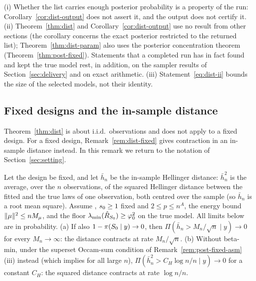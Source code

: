 
\begin{remark}\label{rem:dist-output}
(i) Whether the list carries enough posterior probability is a property of the run: Corollary~\ref{cor:dist-output} does
not assert it, and the output does not certify it.
(ii) Theorem~\ref{thm:dist} and Corollary~\ref{cor:dist-output} use no result from other sections (the corollary concerns
the exact posterior restricted to the returned list);
Theorem~\ref{thm:dist-param} also uses the posterior concentration theorem (Theorem~\ref{thm:post-fixed}). Statements that
a completed run has in fact found and kept the true model rest, in addition, on the sampler results of
Section~\ref{sec:delivery} and on exact arithmetic.
(iii) Statement~\eqref{eq:dist-ii} bounds the size of the selected models, not their identity.
\end{remark}

\subsection{Fixed designs and the in-sample distance}\label{sec:dist-fixed}

Theorem~\ref{thm:dist} is about i.i.d.\ observations and does not apply to a fixed design. For a fixed design,
Remark~\ref{rem:dist-fixed} gives contraction in an in-sample distance instead. In this remark we return to the notation
of Section~\ref{sec:setting}.

\begin{remark}\label{rem:dist-fixed}
Let the design be fixed, and let $\bar h_n$ be the in-sample Hellinger distance: $\bar h_n^2$ is the average, over the $n$
observations, of the squared Hellinger distance between the fitted and the true laws of one observation, both centred over
the sample (so $\bar h_n$ is a root mean square). Assume , $s_0\ge1$ fixed and
$2\le p\le n^A$, the energy bound $\lVert \mu\rVert^2\le nM_\mu$, and the floor $\lambda_{\min}(\hat R_{S_0})\ge\varphi_0^2$ on the true
model. All limits below are in probability. (a) If also $1-\pi(S_0\mid y)\to0$, then $\Pi(\bar h_n>M_n/\sqrt n\mid y)\to0$ for
every $M_n\to\infty$: the distance contracts at rate $M_n/\sqrt n$. (b) Without beta-min, under the superset Occam-sum
condition of Remark~\ref{rem:post-fixed-asm}(iii) instead (which  implies for all large $n$),
$\Pi(\bar h_n^2>C_H\log n/n\mid y)\to0$ for a constant $C_H$: the squared distance contracts at rate $\log n/n$.
\end{remark}

